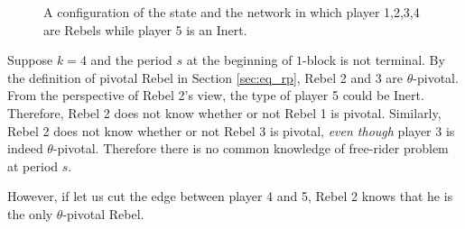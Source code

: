 \documentclass[12pt,letter]{article}
\newtheorem{conjecture}{Conjecture}[section]
\theoremstyle{definition}
\theoremstyle{remark}
\theoremstyle{claim}
\begin{document}
\begin{figure}[!h]
\caption{A configuration of the state and the network in which player 1,2,3,4 are Rebels while player 5 is an Inert.}
\label{fig:cyclic_network}
\begin{center}
\end{center}
\end{figure}

Suppose $k=4$ and the period $s$ at the beginning of $1$-block is not terminal. By the definition of pivotal Rebel in Section \ref{sec:eq_rp}, Rebel 2 and 3 are $\theta$-pivotal. From the perspective of Rebel 2's view, the type of player 5 could be Inert. Therefore, Rebel 2 does not know whether or not Rebel 1 is pivotal. Similarly, Rebel 2 does not know whether or not Rebel 3 is pivotal, \textit{even though} player 3 is indeed $\theta$-pivotal. Therefore there is no common knowledge of free-rider problem at period $s$.  

However, if let us cut the edge between player 4 and 5, Rebel 2 knows that he is the only $\theta$-pivotal Rebel.


%
%
%
%
\end{document}
